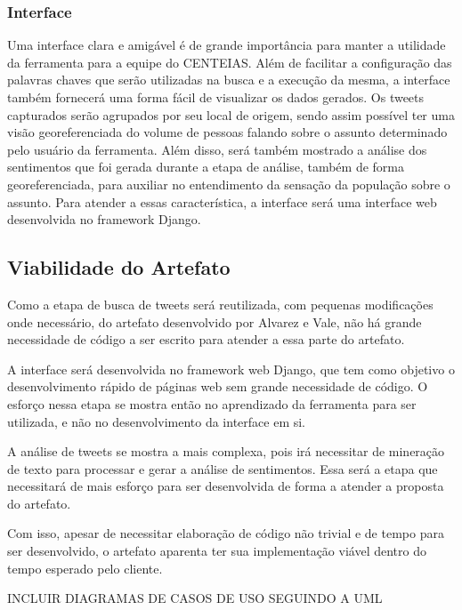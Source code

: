 \documentclass[12pt]{article}
\newcommand{\rascbegin}{\color{red}}    %
\newcommand{\rascend}{\color{black}}    %
\begin{document}
    \subsubsection{Interface}
    Uma interface clara e amigável é de grande importância para manter a utilidade da ferramenta para a equipe do CENTEIAS. Além de facilitar a configuração das palavras chaves que serão utilizadas na busca e a execução da mesma, a interface também fornecerá uma forma fácil de visualizar os dados gerados. Os tweets capturados serão agrupados por seu local de origem, sendo assim possível ter uma visão georeferenciada do volume de pessoas falando sobre o assunto determinado pelo usuário da ferramenta. Além disso, será também mostrado a análise dos sentimentos que foi gerada durante a etapa de análise, também de forma georeferenciada, para auxiliar no entendimento da sensação da população sobre o assunto. Para atender a essas característica, a interface será uma interface web desenvolvida no framework Django.
    
    \subsection{Viabilidade do Artefato}
    Como a etapa de busca de tweets será reutilizada, com pequenas modificações onde necessário, do artefato desenvolvido por Alvarez e Vale, não há grande necessidade de código a ser escrito para atender a essa parte do artefato.
    
    A interface será desenvolvida no framework web Django, que tem como objetivo o desenvolvimento rápido de páginas web sem grande necessidade de código. O esforço nessa etapa se mostra então no aprendizado da ferramenta para ser utilizada, e não no desenvolvimento da interface em si.
    
    A análise de tweets se mostra a mais complexa, pois irá necessitar de mineração de texto para processar e gerar a análise de sentimentos. Essa será a etapa que necessitará de mais esforço para ser desenvolvida de forma a atender a proposta do artefato.
    
    Com isso, apesar de necessitar elaboração de código não trivial e de tempo para ser desenvolvido, o artefato aparenta ter sua implementação viável dentro do tempo esperado pelo cliente.
    
    
    
    
    \rascbegin
    INCLUIR DIAGRAMAS DE CASOS DE USO SEGUINDO A UML
    \rascend
\end{document}
